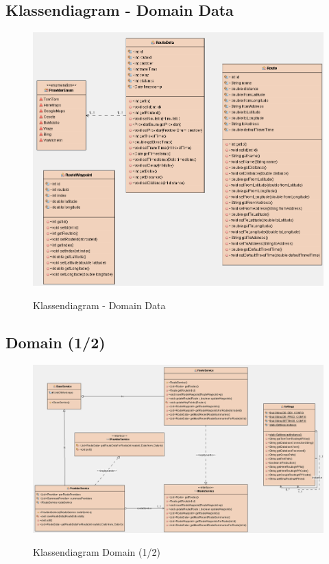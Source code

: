 \documentclass[a4paper]{article}
\begin{document}
\subsection{Klassendiagram - Domain Data}

\begin{figure}[H]
\centering
\includegraphics[width=\textwidth]{Images/kdiadomaindatar.png}\\
\caption{Klassendiagram - Domain Data}
\end{figure}

\subsection{Domain (1/2)}

\begin{figure}[H]
\centering
\includegraphics[width=\textwidth]{Images/kdiadomain1r.png}\\
\caption{Klassendiagram Domain (1/2)}
\end{figure}
\end{document}
